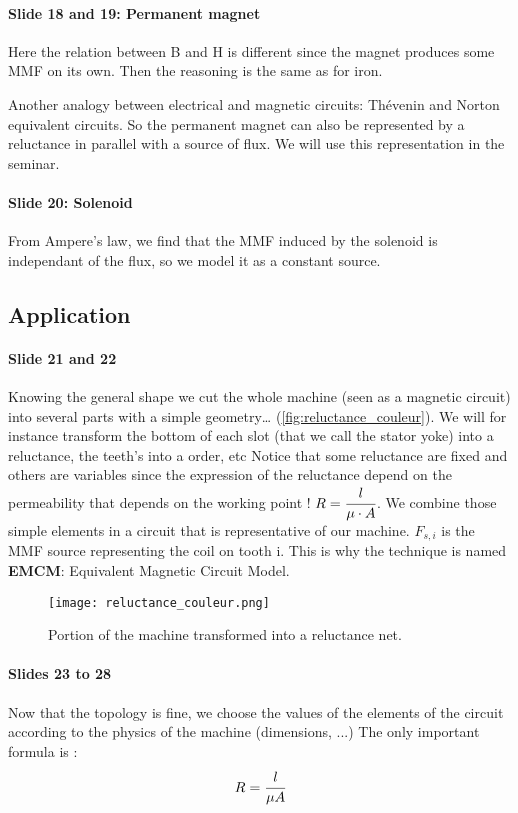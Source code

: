 \paragraph{Slide 18 and 19: Permanent magnet}
Here the relation between B and H is different since the magnet produces some MMF on its own.
Then the reasoning is the same as for iron.

Another analogy between electrical and magnetic circuits: Thévenin and Norton equivalent circuits. So the permanent magnet can also be represented by a reluctance in parallel with a source of flux. We will use this representation in the seminar.

\paragraph{Slide 20: Solenoid}
From Ampere's law, we find that the MMF induced by the solenoid is independant of the flux, so we model it as a constant source.

\subsection{Application}

\paragraph{Slide 21 and 22}
Knowing the general shape we cut the whole machine (seen as a magnetic circuit) into several parts with a simple geometry… (\autoref{fig:reluctance_couleur}). We will for instance transform the bottom of each slot (that we call the stator yoke) into a reluctance, the teeth’s into a order, etc 
Notice that some reluctance are fixed and others are variables since the expression of the reluctance depend on the permeability that depends on the working point ! $R=\cfrac{l}{\mu \cdot A}$.
We combine those simple elements in a circuit that is representative of our machine. $F_{s,i}$ is the MMF source representing the coil on tooth i.
This is why the technique is named \textbf{EMCM}: Equivalent Magnetic Circuit Model.

\begin{figure}[h!]
    \centering
    \texttt{[image: reluctance\_couleur.png]}
    \caption{Portion of the machine transformed into a reluctance net.}
    \label{fig:reluctance_couleur}
\end{figure}

\paragraph{Slides 23 to 28}
Now that the topology is fine, we choose the values of the elements of the circuit according to the physics of the machine (dimensions, ...)
The only important formula is :
$$ R = \cfrac{l}{\mu A}$$

